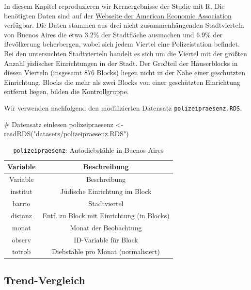 \documentclass[
  a4paper,
  DIV=11,
  oneside]{scrreprt}
\newenvironment{Shaded}{\begin{snugshade}}{\end{snugshade}}
\newcommand{\CommentTok}[1]{\textcolor[rgb]{0.37,0.37,0.37}{#1}}
\newcommand{\FunctionTok}[1]{\textcolor[rgb]{0.28,0.35,0.67}{#1}}
\newcommand{\NormalTok}[1]{\textcolor[rgb]{0.00,0.23,0.31}{#1}}
\newcommand{\OtherTok}[1]{\textcolor[rgb]{0.00,0.23,0.31}{#1}}
\newcommand{\StringTok}[1]{\textcolor[rgb]{0.13,0.47,0.30}{#1}}
\begin{document}
In diesem Kapitel reproduzieren wir Kernergebnisse der Studie mit R. Die
benötigten Daten sind auf der
\href{https://www.aeaweb.org/articles?id=10.1257/000282804322970733}{Webseite
der American Economic Association} verfügbar. Die Daten stammen aus drei
nicht zusammenhängenden Stadtvierteln von Buenos Aires die etwa
\(3.2\%\) der Stadtfläche ausmachen und \(6.9\%\) der Bevölkerung
beherbergen, wobei sich jedem Viertel eine Polizeistation befindet. Bei
den untersuchten Stadtvierteln handelt es sich um die Viertel mit der
größten Anzahl jüdischer Einrichtungen in der Stadt. Der Großteil der
Häuserblocks in diesen Vierteln (insgesamt 876 Blocks) liegen nicht in
der Nähe einer geschützten Einrichtung. Blocks die mehr als zwei Blocks
von einer geschützten Einrichtung entfernt liegen, bilden die
Kontrollgruppe.

Wir verwenden nachfolgend den modifizierten Datensatz
\texttt{polizeipraesenz.RDS}.

\begin{Shaded}
\begin{Highlighting}[]
\CommentTok{\# Datensatz einlesen}
\NormalTok{polizeipraesenz }\OtherTok{\textless{}{-}} \FunctionTok{readRDS}\NormalTok{(}\StringTok{"datasets/polizeipraesenz.RDS"}\NormalTok{)}
\end{Highlighting}
\end{Shaded}

\begin{longtable}[]{@{}cc@{}}
\caption{\texttt{polizeipraesenz}: Autodiebstähle in Buenos
Aires}\label{tbl-polpr}\tabularnewline
\toprule\noalign{}
Variable & Beschreibung \\
\midrule\noalign{}
\endfirsthead
\toprule\noalign{}
Variable & Beschreibung \\
\midrule\noalign{}
\endhead
\bottomrule\noalign{}
\endlastfoot
institut & Jüdische Einrichtung im Block \\
barrio & Stadtviertel \\
distanz & Entf. zu Block mit Einrichtung (in Blocks) \\
monat & Monat der Beobachtung \\
observ & ID-Variable für Block \\
totrob & Diebstähle pro Monat (normalisiert) \\
\end{longtable}

\subsection{Trend-Vergleich}\label{trend-vergleich}
\end{document}
